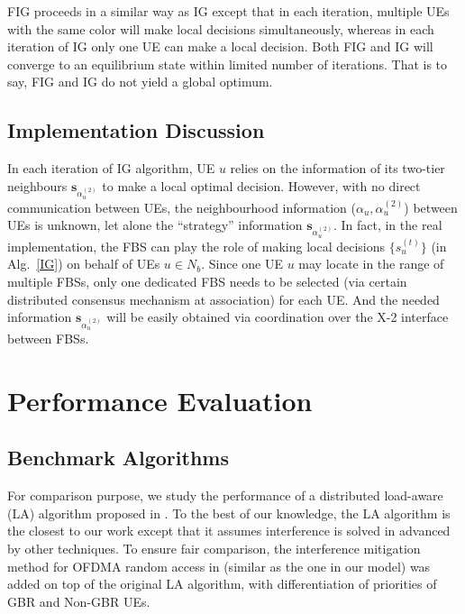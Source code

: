 \documentclass[conference]{IEEEtran}
\begin{document}
FIG proceeds in a similar way as IG except that in each iteration, multiple UEs with the same color will make local decisions simultaneously, whereas in each iteration of IG only one UE can make a local decision. Both FIG and IG will converge to an equilibrium state within limited number of iterations. That is to say, FIG and IG do not yield a global optimum.





\subsection{Implementation Discussion}


In each iteration of IG algorithm, UE $u$ relies on the information of its two-tier neighbours $\boldsymbol{s}_{\alpha_u^{(2)}}$ to make a local optimal decision. However, with no direct communication between UEs, the neighbourhood information ($\alpha_u, \alpha_u^{(2)}$) between UEs is unknown, let alone the ``strategy'' information $\boldsymbol{s}_{\alpha_u^{(2)}}$. In fact, in the real implementation, the FBS can play the role of making local decisions $\{s_u^{(t)}\}$ (in Alg.~\ref{IG}) on behalf of UEs $u\in N_b$. Since one UE $u$ may locate in the range of multiple FBSs, only one dedicated FBS needs to be selected (via certain distributed consensus mechanism at association) for each UE. And the needed information $\boldsymbol{s}_{\alpha_u^{(2)}}$ will be easily obtained via coordination over the X-2 interface between FBSs.  








\section{Performance Evaluation}\label{simulation}

\subsection{Benchmark Algorithms}


For comparison purpose, we study the performance of a distributed load-aware (LA) algorithm proposed in \cite{zhou2009green}. To the best of our knowledge, the LA algorithm is the closest to our work except that it assumes interference is solved in advanced by other techniques. To ensure fair comparison, the interference mitigation method for OFDMA random access in \cite{hou2011proportionally} (similar as the one in our model) was added on top of the original LA algorithm, with differentiation of priorities of GBR and Non-GBR UEs.
\end{document}
